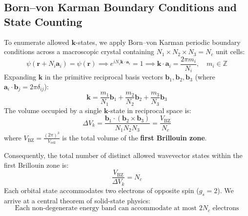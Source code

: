 \documentclass[11pt,a4paper]{article}
\newcommand{\vb}[1]{\mathbf{#1}}
\begin{document}
\subsection{Born--von Karman Boundary Conditions and State Counting}
To enumerate allowed $\vb{k}$-states, we apply Born--von Karman periodic boundary conditions across a macroscopic crystal containing $N_1 \times N_2 \times N_3 = N_c$ unit cells:
\begin{equation}
\psi(\vb{r} + N_i \vb{a}_i) = \psi(\vb{r}) \implies e^{i N_i \vb{k}\cdot\vb{a}_i} = 1 \implies \vb{k}\cdot\vb{a}_i = \frac{2\pi m_i}{N_i}, \quad m_i \in \mathbb{Z}
\end{equation}
Expanding $\vb{k}$ in the primitive reciprocal basis vectors $\vb{b}_1, \vb{b}_2, \vb{b}_3$ (where $\vb{a}_i \cdot \vb{b}_j = 2\pi\delta_{ij}$):
\begin{equation}
\vb{k} = \frac{m_1}{N_1}\vb{b}_1 + \frac{m_2}{N_2}\vb{b}_2 + \frac{m_3}{N_3}\vb{b}_3
\label{eq:k_grid_bvk}
\end{equation}
The volume occupied by a single $\vb{k}$-state in reciprocal space is:
\begin{equation}
\Delta V_k = \frac{\vb{b}_1 \cdot (\vb{b}_2 \times \vb{b}_3)}{N_1 N_2 N_3} = \frac{V_{\mathrm{BZ}}}{N_c}
\end{equation}
where $V_{\mathrm{BZ}} = \frac{(2\pi)^3}{V_{\mathrm{cell}}}$ is the total volume of the \textbf{first Brillouin zone}.

Consequently, the total number of distinct allowed wavevector states within the first Brillouin zone is:
\begin{equation}
\frac{V_{\mathrm{BZ}}}{\Delta V_k} = N_c
\end{equation}
Each orbital state accommodates two electrons of opposite spin ($g_s = 2$). We arrive at a central theorem of solid-state physics:
\begin{equation}
\boxed{\text{Each non-degenerate energy band can accommodate at most } 2N_c \text{ electrons}}
\label{eq:band_capacity_2Nc}
\end{equation}
\end{document}
